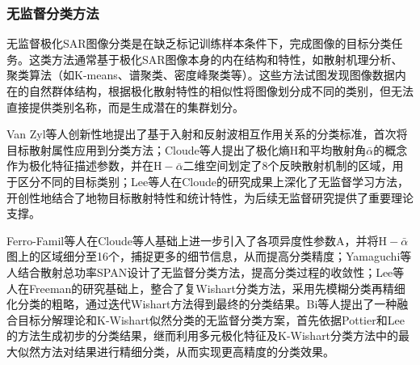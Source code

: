 \subsubsection{无监督分类方法}
无监督极化SAR图像分类是在缺乏标记训练样本条件下，完成图像的目标分类任务。这类方法通常基于极化SAR图像本身的内在结构和特性，如散射机理分析、聚类算法（如K-means、谱聚类、密度峰聚类等）。这些方法试图发现图像数据内在的自然群体结构，根据极化散射特性的相似性将图像划分成不同的类别，但无法直接提供类别名称，而是生成潜在的集群划分。

Van Zyl等人创新性地提出了基于入射和反射波相互作用关系的分类标准，首次将目标散射属性应用到分类方法；Cloude等人提出了极化熵$\mathrm{H}$和平均散射角$\bar{\alpha}$的概念作为极化特征描述参数，并在$\mathrm{H}-\bar{\alpha}$二维空间划定了8个反映散射机制的区域，用于区分不同的目标类别；Lee等人在Cloude的研究成果上深化了无监督学习方法，开创性地结合了地物目标散射特性和统计特性，为后续无监督研究提供了重要理论支撑。


Ferro-Famil等人在Cloude等人基础上进一步引入了各项异度性参数$\mathrm{A}$，并将$\mathrm{H}-\bar{\alpha}$图上的区域细分至16个，捕捉更多的细节信息，从而提高分类精度；Yamaguchi等人结合散射总功率SPAN设计了无监督分类方法，提高分类过程的收敛性；Lee等人在Freeman的研究基础上，整合了复Wishart分类方法，采用先模糊分类再精细化分类的粗略，通过迭代Wishart方法得到最终的分类结果。Bi等人提出了一种融合目标分解理论和K-Wishart似然分类的无监督分类方案，首先依据Pottier和Lee的方法生成初步的分类结果，继而利用多元极化特征及K-Wishart分类方法中的最大似然方法对结果进行精细分类，从而实现更高精度的分类效果。


